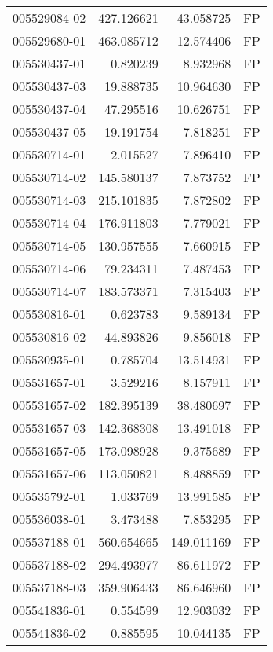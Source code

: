 \begin{tabular}{lrrl}
005529084-02 &  427.126621 &      43.058725 &   FP \\
005529680-01 &  463.085712 &      12.574406 &   FP \\
005530437-01 &    0.820239 &       8.932968 &   FP \\
005530437-03 &   19.888735 &      10.964630 &   FP \\
005530437-04 &   47.295516 &      10.626751 &   FP \\
005530437-05 &   19.191754 &       7.818251 &   FP \\
005530714-01 &    2.015527 &       7.896410 &   FP \\
005530714-02 &  145.580137 &       7.873752 &   FP \\
005530714-03 &  215.101835 &       7.872802 &   FP \\
005530714-04 &  176.911803 &       7.779021 &   FP \\
005530714-05 &  130.957555 &       7.660915 &   FP \\
005530714-06 &   79.234311 &       7.487453 &   FP \\
005530714-07 &  183.573371 &       7.315403 &   FP \\
005530816-01 &    0.623783 &       9.589134 &   FP \\
005530816-02 &   44.893826 &       9.856018 &   FP \\
005530935-01 &    0.785704 &      13.514931 &   FP \\
005531657-01 &    3.529216 &       8.157911 &   FP \\
005531657-02 &  182.395139 &      38.480697 &   FP \\
005531657-03 &  142.368308 &      13.491018 &   FP \\
005531657-05 &  173.098928 &       9.375689 &   FP \\
005531657-06 &  113.050821 &       8.488859 &   FP \\
005535792-01 &    1.033769 &      13.991585 &   FP \\
005536038-01 &    3.473488 &       7.853295 &   FP \\
005537188-01 &  560.654665 &     149.011169 &   FP \\
005537188-02 &  294.493977 &      86.611972 &   FP \\
005537188-03 &  359.906433 &      86.646960 &   FP \\
005541836-01 &    0.554599 &      12.903032 &   FP \\
005541836-02 &    0.885595 &      10.044135 &   FP \\

\end{tabular}
